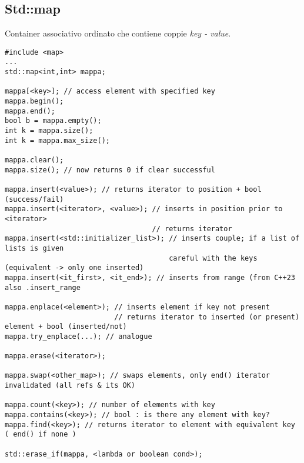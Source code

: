 \documentclass[10pt, oneside]{Book}
\begin{document}
\subsection{Std::map}
Container associativo ordinato che contiene coppie \textit{key - value}.
\begin{verbatim}
#include <map>
...
std::map<int,int> mappa;

mappa[<key>]; // access element with specified key
mappa.begin();
mappa.end();
bool b = mappa.empty();
int k = mappa.size();
int k = mappa.max_size();

mappa.clear();
mappa.size(); // now returns 0 if clear successful

mappa.insert(<value>); // returns iterator to position + bool (success/fail)
mappa.insert(<iterator>, <value>); // inserts in position prior to <iterator>
                                   // returns iterator
mappa.insert(<std::initializer_list>); // inserts couple; if a list of lists is given
                                       careful with the keys (equivalent -> only one inserted)
mappa.insert(<it_first>, <it_end>); // inserts from range (from C++23 also .insert_range

mappa.enplace(<element>); // inserts element if key not present
                          // returns iterator to inserted (or present) element + bool (inserted/not)
mappa.try_enplace(...); // analogue

mappa.erase(<iterator>);

mappa.swap(<other_map>); // swaps elements, only end() iterator invalidated (all refs & its OK)

mappa.count(<key>); // number of elements with key
mappa.contains(<key>); // bool : is there any element with key?
mappa.find(<key>); // returns iterator to element with equivalent key ( end() if none )

std::erase_if(mappa, <lambda or boolean cond>);
\end{verbatim}
\end{document}
